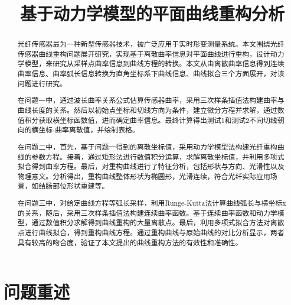 \documentclass[withoutpreface,bwprint]{cumcmthesis}
\title{基于动力学模型的平面曲线重构分析} %
\begin{document}
 \maketitle
 \begin{abstract}%
 
光纤传感器最为一种新型传感器技术，被广泛应用于实时形变测量系统。本文围绕光纤传感器曲线重构问题展开研究，实现基于离散曲率信息对平面曲线进行重构，设计动力学模型，来研究从采样点曲率信息到曲线方程的转换。本文从由离散曲率信息得到连续曲率信息、曲率弧长信息转换为直角坐标系下曲线信息、曲线拟合三个方面展开，对该问题进行研究。

在问题一中，通过波长曲率关系公式估算传感器曲率，采用三次样条插值法构建曲率与曲线长度的关系。然后以初始点坐标和切线方向为条件，建立微分方程并求解，通过数值积分获取横坐标函数值，进而确定曲率信息。最终计算得出测试1和测试2不同切线朝向的横坐标-曲率离散值，并绘制表格。



在问题二中，首先，基于问题一得到的离散坐标值，采用动力学模型法构建光纤重构曲线的参数方程。接着，通过矩形法进行数值积分运算，求解离散坐标值，并利用多项式拟合得到曲率方程。最后，对重构曲线进行了特征分析，包括形状与方向、光滑性以及物理意义。分析得出，重构曲线整体形状为椭圆形，光滑连续，符合光纤实际应用场景，如结肠部位形状重建等。

在问题三中，对给定曲线方程等弧长采样，利用Runge-Kutta法计算曲线弧长与横坐标x的关系，随后，采用三次样条插值法构建连续曲率函数。基于连续曲率函数和动力学模型，通过数值积分求解得到曲线重构的大量离散点。最后，利用多项式拟合方法对离散点进行曲线拟合，得到重构曲线方程。通过重构曲线与原始曲线的对比分析显示，两者具有较高的吻合度，验证了本文提出的曲线重构方法的有效性和准确性。

\vspace{1cm}


\end{abstract}

\tableofcontents
\clearpage 
\section{问题重述}
\end{document}
